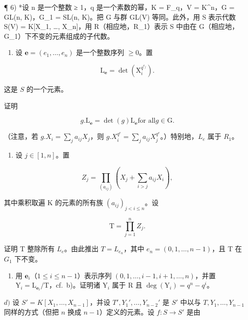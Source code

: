 ¶ 6) *设 n 是一个整数 ≥ 1，q 是一个素数的幂，K = F\_q，V = K\^{}n，G = GL(n, K)，G\_1 = SL(n, K)。把 G 与群 GL(V) 等同。此外，用 S 表示代数 S(V) = K{[}X\_1, \ldots, X\_n{]}，用 R（相应地，R\_1）表示 S 中由在 G（相应地，G\_1）下不变的元素组成的子代数。

\begin{enumerate}
\def\labelenumi{\alph{enumi})}
\tightlist
\item
  设 \(\mathbf{e} = (e_1, \ldots, e_n)\) 是一个整数序列 \(\geqslant 0\)。置
\end{enumerate}

\[
\mathrm{L} _ {\mathbf {e}} = \det (\mathrm{X} _ {i} ^ {q ^ {e _ {j}}}).
\]

这是 \(S\) 的一个元素。

证明

\[
g. \mathrm{L} _ {\mathbf {e}} = \det (g) \mathrm{L} _ {\mathbf {e}} \text {for all} g \in \mathrm{G}.
\]

（注意，若 \(g.X_i = \sum_j a_{ij} X_j\)，则 \(g.X_i^{q^e} = \sum_j a_{ij} X_j^{q^e}\)。）特别地，\(L_e\) 属于 \(R_1\)。

\begin{enumerate}
\def\labelenumi{\alph{enumi})}
\setcounter{enumi}{1}
\tightlist
\item
  设 \(j \in [1, n]\)。置
\end{enumerate}

\[
Z _ {j} = \prod_ {(a _ {i j})} (X _ {j} + \sum_ {i > j} a _ {i j} X _ {i}),
\]

其中乘积取遍 K 的元素的所有族 \((a_{ij})_{j < i\leqslant n}\)。设

\[
\mathrm{T} = \prod_ {j = 1} ^ {n} Z _ {j}.
\]

证明 T 整除所有 \(L_{e}\)。由此推出 \(T = L_{e_{n}}\)，其中 \(e_{n} = (0, 1, \ldots, n - 1)\)，且 T 在 \(G_{1}\) 下不变。

\begin{enumerate}
\def\labelenumi{\alph{enumi})}
\setcounter{enumi}{2}
\tightlist
\item
  用 \(\mathbf{e}_i\)（\(1 \leqslant i \leqslant n - 1\)）表示序列 \((0, 1, \ldots, i - 1, i + 1, \ldots, n)\)，并置 \(\mathrm{Y}_i = \mathrm{L}_{\mathbf{e}_i} / \mathrm{T}\)，cf.~b)。证明诸 \(\mathrm{Y}_i\) 属于 R 且 \(\deg(\mathrm{Y}_i) = q^n - q^i\)。
\end{enumerate}

\(d)\) 设 \(S' = K[X_1, \ldots, X_{n-1}]\)，并设 \(T', Y_1', \ldots, Y_{n-2}'\) 是 \(S'\) 中以与 \(T, Y_1, \ldots, Y_{n-1}\) 同样的方式（但把 \(n\) 换成 \(n-1\)）定义的元素。设 \(f: S \to S'\) 是由

